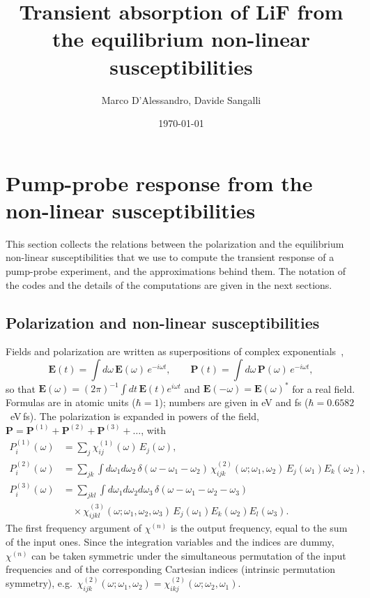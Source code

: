 \documentclass[10pt,a4paper]{paper}
\title{Transient absorption of LiF from the equilibrium non-linear susceptibilities}
\author{Marco D'Alessandro, Davide Sangalli}
\date{\today}
\begin{document}
\maketitle

\section{Pump-probe response from the non-linear susceptibilities}
\label{sec:theory}

This section collects the relations between the polarization and the equilibrium non-linear susceptibilities that
we use to compute the transient response of a pump-probe experiment, and the approximations behind them. The
notation of the codes and the details of the computations are given in the next sections.

\subsection{Polarization and non-linear susceptibilities}
\label{sec:theory_chi}

Fields and polarization are written as superpositions of complex exponentials~\cite{Boyd},
\begin{equation}
\bm{E}(t) = \int d\omega\,\bm{E}(\omega)\,e^{-i\omega t} , \qquad
\bm{P}(t) = \int d\omega\,\bm{P}(\omega)\,e^{-i\omega t} ,
\label{eq:fourier}
\end{equation}
so that $\bm{E}(\omega) = (2\pi)^{-1}\int dt\,\bm{E}(t)e^{i\omega t}$ and $\bm{E}(-\omega) = \bm{E}(\omega)^*$ for a
real field. Formulas are in atomic units ($\hbar = 1$); numbers are given in eV and fs ($\hbar = 0.6582$~eV\,fs).
The polarization is expanded in powers of the field, $\bm{P} = \bm{P}^{(1)}+\bm{P}^{(2)}+\bm{P}^{(3)}+\dots$, with
\begin{align}
P^{(1)}_i(\omega) &= \sum_j\chi^{(1)}_{ij}(\omega)\,E_j(\omega) , \label{eq:P1}\\
P^{(2)}_i(\omega) &= \sum_{jk}\int d\omega_1 d\omega_2\,\delta(\omega-\omega_1-\omega_2)\,
\chi^{(2)}_{ijk}(\omega;\omega_1,\omega_2)\,E_j(\omega_1)E_k(\omega_2) , \label{eq:P2}\\
P^{(3)}_i(\omega) &= \sum_{jkl}\int d\omega_1 d\omega_2 d\omega_3\,\delta(\omega-\omega_1-\omega_2-\omega_3)
\nonumber\\
&\quad\times\chi^{(3)}_{ijkl}(\omega;\omega_1,\omega_2,\omega_3)\,E_j(\omega_1)E_k(\omega_2)E_l(\omega_3) .
\label{eq:P3}
\end{align}
The first frequency argument of $\chi^{(n)}$ is the output frequency, equal to the sum of the input ones. Since the
integration variables and the indices are dummy, $\chi^{(n)}$ can be taken symmetric under the simultaneous
permutation of the input frequencies and of the corresponding Cartesian indices (intrinsic permutation symmetry),
e.g.\ $\chi^{(2)}_{ijk}(\omega;\omega_1,\omega_2) = \chi^{(2)}_{ikj}(\omega;\omega_2,\omega_1)$.
\end{document}
